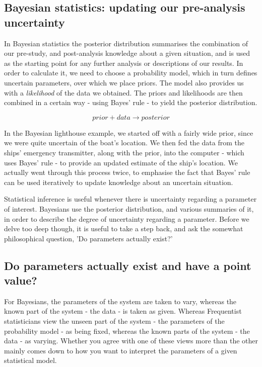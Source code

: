 \documentclass[11pt,fullpage]{book}
\begin{document}
\subsection{Bayesian statistics: updating our pre-analysis uncertainty}
In Bayesian statistics the posterior distribution summarises the combination of our pre-study, and post-analysis knowledge about a given situation, and is used as the starting point for any further analysis or descriptions of our results. In order to calculate it, we need to choose a probability model, which in turn defines uncertain parameters, over which we place priors. The model also provides us with a \textit{likelihood} of the data we obtained. The priors and likelihoods are then combined in a certain way - using Bayes' rule - to yield the posterior distribution.

\begin{equation}
prior + data \rightarrow posterior
\end{equation}

In the Bayesian lighthouse example, we started off with a fairly wide prior, since we were quite uncertain of the boat's location. We then fed the data from the ships' emergency transmitter, along with the prior, into the computer - which uses Bayes' rule - to provide an updated estimate of the ship's location. We actually went through this process twice, to emphasise the fact that Bayes' rule can be used iteratively to update knowledge about an uncertain situation.

Statistical inference is useful whenever there is uncertainty regarding a parameter of interest. Bayesians use the posterior distribution, and various summaries of it, in order to describe the degree of uncertainty regarding a parameter. Before we delve too deep though, it is useful to take a step back, and ask the somewhat philosophical question, 'Do parameters actually exist?' 

\subsection{Do parameters actually exist and have a point value?}\label{sec:Posterior_parametersExist}
For Bayesians, the parameters of the system are taken to vary, whereas the known part of the system - the data - is taken as given. Whereas Frequentist statisticians view the unseen part of the system - the parameters of the probability model - as being fixed, whereas the known parts of the system - the data - as varying. Whether you agree with one of these views more than the other mainly comes down to how you want to interpret the parameters of a given statistical model. 
\end{document}
